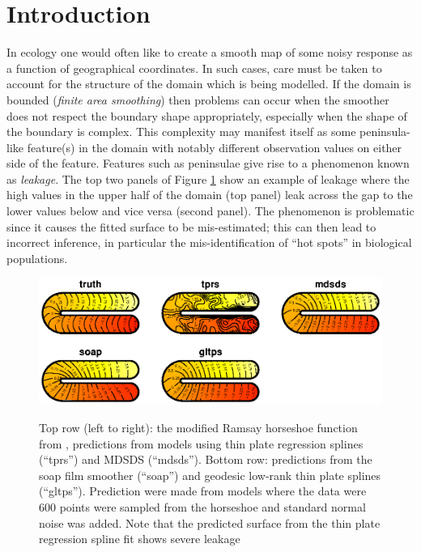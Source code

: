 \documentclass[smallextended]{svjour3}       %
\begin{document}
\section{Introduction \label{IN}}

In ecology one would often like to create a smooth map of some noisy response as a function of geographical coordinates. In such cases, care must be taken to account for the structure of the domain which is being modelled. If the domain is bounded (\textit{finite area smoothing}) then problems can occur when the smoother does not respect the boundary shape appropriately, especially when the shape of the boundary is complex. This complexity may manifest itself as some peninsula-like feature(s) in the domain with notably different observation values on either side of the feature. Features such as peninsulae give rise to a phenomenon known as \emph{leakage}. The top two panels of Figure \ref{leakage} show an example of leakage \citep[taken from][]{Wood:2008vo} where the high values in the upper half of the domain (top panel) leak across the gap to the lower values below and vice versa (second panel). The phenomenon is problematic since it causes the fitted surface to be mis-estimated; this can then lead to incorrect inference, in particular the mis-identification of ``hot spots'' in biological populations.

\begin{figure}
\centering
\includegraphics[width=\textwidth]{Fig1.eps}\\
\caption{Top row (left to right): the modified Ramsay horseshoe function from \protect\cite{Wood:2008vo}, predictions from models using thin plate regression splines (``tprs'') and MDSDS (``mdsds''). Bottom row: predictions from the soap film smoother (``soap'') and geodesic low-rank thin plate splines (``gltps''). Prediction were made from models where the data were 600 points were sampled from the horseshoe and standard normal noise was added. Note that the predicted surface from the thin plate regression spline fit shows severe leakage
\label{leakage}}
\end{figure}
\end{document}
